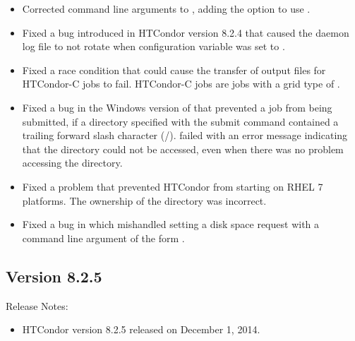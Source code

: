 \begin{itemize}

\item Corrected command line arguments to ,
adding the option to use .

\item Fixed a bug introduced in HTCondor version 8.2.4 that caused the 
 daemon log file to not rotate when
configuration variable 
 was set to .

\item Fixed a race condition that could cause the transfer of output files
for HTCondor-C jobs to fail.
HTCondor-C jobs are   jobs 
with a grid type of .

\item Fixed a bug in the Windows version of 
that prevented a job from being submitted,
if a directory specified with the submit command
 contained a trailing forward slash
character (/).  
 failed with an error message indicating that 
the directory could not be accessed,
even when there was no problem accessing the directory.

\item Fixed a problem that prevented HTCondor from starting
on RHEL 7 platforms.
The ownership of the directory  was incorrect.

\item Fixed a bug in which  mishandled setting a disk space
request with a command line argument of the form .

\end{itemize}

\subsection*{\label{sec:New-8-2-5}Version 8.2.5}

\noindent Release Notes:

\begin{itemize}

\item HTCondor version 8.2.5 released on December 1, 2014.

\end{itemize}


